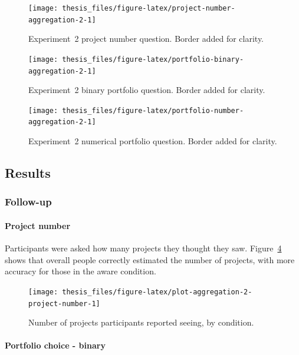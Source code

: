 \documentclass[a4paper, nobind, dvipsnames]{templates/ociamthesis}
\theoremstyle{definition}
\theoremstyle{definition}
\theoremstyle{definition}
\theoremstyle{definition}
\theoremstyle{remark}
\begin{document}
\begin{figure}
\texttt{[image: thesis\_files/figure-latex/project-number-aggregation-2-1]} \caption{Experiment~2 project number question. Border added for clarity.}\label{fig:project-number-aggregation-2}
\end{figure}



\begin{figure}
\texttt{[image: thesis\_files/figure-latex/portfolio-binary-aggregation-2-1]} \caption{Experiment~2 binary portfolio question. Border added for clarity.}\label{fig:portfolio-binary-aggregation-2}
\end{figure}



\begin{figure}
\texttt{[image: thesis\_files/figure-latex/portfolio-number-aggregation-2-1]} \caption{Experiment~2 numerical portfolio question. Border added for clarity.}\label{fig:portfolio-number-aggregation-2}
\end{figure}

\hypertarget{results-aggregation-2-appendix}{%
\subsection{Results}\label{results-aggregation-2-appendix}}

\subsubsection{Follow-up}

\paragraph{Project number}

Participants were asked how many projects they thought they saw.
Figure~\ref{fig:plot-aggregation-2-project-number} shows that overall people
correctly estimated the number of projects, with more accuracy for those in the
aware condition.



\begin{figure}
\texttt{[image: thesis\_files/figure-latex/plot-aggregation-2-project-number-1]} \caption{Number of projects participants reported seeing, by condition.}\label{fig:plot-aggregation-2-project-number}
\end{figure}

\paragraph{Portfolio choice - binary}
\end{document}
